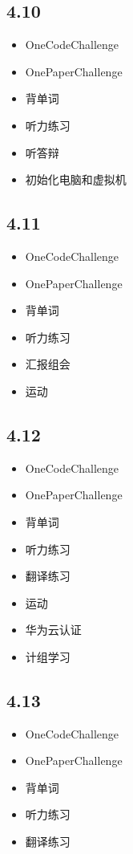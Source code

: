 \documentclass[UTF8]{ctexart}
\begin{document}
\subsection*{4.10}
\begin{itemize}
    \item OneCodeChallenge
    \item OnePaperChallenge
    \item 背单词
    \item 听力练习
    \item 听答辩
    \item 初始化电脑和虚拟机
\end{itemize}

\subsection*{4.11}
\begin{itemize}
    \item OneCodeChallenge
    \item OnePaperChallenge
    \item 背单词
    \item 听力练习
    \item 汇报组会
    \item 运动
\end{itemize}

\subsection*{4.12}
\begin{itemize}
    \item OneCodeChallenge
    \item OnePaperChallenge
    \item 背单词
    \item 听力练习
    \item 翻译练习
    \item 运动
    \item 华为云认证
    \item 计组学习
\end{itemize}

\subsection*{4.13}
\begin{itemize}
    \item OneCodeChallenge
    \item OnePaperChallenge
    \item 背单词
    \item 听力练习
    \item 翻译练习
\end{itemize}
\end{document}
